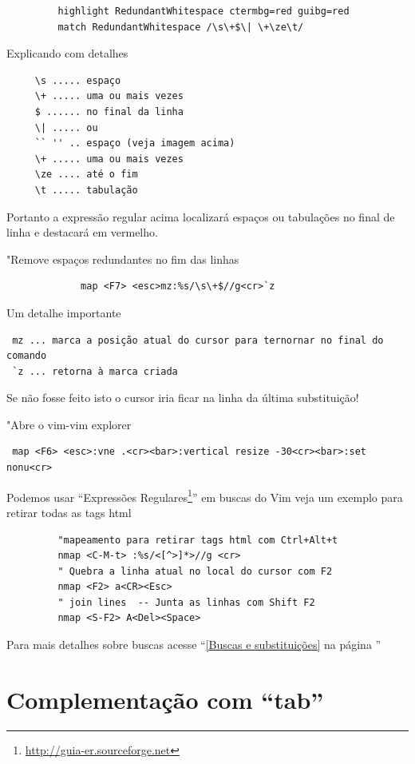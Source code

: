 \documentclass[10pt,a4paper,openany]{book}
\begin{document}
\begin{verbatim}
		 highlight RedundantWhitespace ctermbg=red guibg=red
		 match RedundantWhitespace /\s\+$\| \+\ze\t/
\end{verbatim}

Explicando com detalhes

\begin{verbatim}
	 \s ..... espaço
	 \+ ..... uma ou mais vezes
	 $ ...... no final da linha
	 \| ..... ou
	 `` '' .. espaço (veja imagem acima)
	 \+ ..... uma ou mais vezes
	 \ze .... até o fim
	 \t ..... tabulação
\end{verbatim}

Portanto a expressão regular acima localizará espaços ou tabulações no final de linha
e destacará em vermelho.

"Remove espaços redundantes no fim das linhas

\begin{verbatim}
			 map <F7> <esc>mz:%s/\s\+$//g<cr>`z
\end{verbatim}

Um detalhe importante

\begin{verbatim}
 mz ... marca a posição atual do cursor para ternornar no final do comando
 `z ... retorna à marca criada
\end{verbatim}

Se não fosse feito isto o cursor iria ficar na linha da última substituição!

"Abre o vim-vim explorer

\begin{verbatim}
 map <F6> <esc>:vne .<cr><bar>:vertical resize -30<cr><bar>:set nonu<cr>
\end{verbatim}

Podemos usar ``Expressões Regulares\footnote{\url{http://guia-er.sourceforge.net}}'' em
buscas do Vim veja um exemplo para retirar todas as tags html

\begin{verbatim}
		 "mapeamento para retirar tags html com Ctrl+Alt+t
		 nmap <C-M-t> :%s/<[^>]*>//g <cr>
		 " Quebra a linha atual no local do cursor com F2
		 nmap <F2> a<CR><Esc>
		 " join lines  -- Junta as linhas com Shift F2
		 nmap <S-F2> A<Del><Space>
\end{verbatim}

Para mais detalhes sobre buscas acesse ``\ref{Buscas e substituições}
na página \pageref{Buscas e substituições}''

\section{Complementação com ``tab''}\label{Complementação com ``tab''}
\end{document}
